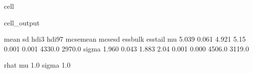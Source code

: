 \documentclass[letterpaper,10pt,english]{jupyterBook}
\begin{document}
\begin{sphinxuseclass}{cell}
\begin{sphinxVerbatimOutput}
\begin{sphinxuseclass}{cell_output}
\begin{sphinxVerbatim}[commandchars=\\\{\}]
        mean     sd  hdi\PYGZus{}3\PYGZpc{}  hdi\PYGZus{}97\PYGZpc{}  mcse\PYGZus{}mean  mcse\PYGZus{}sd  ess\PYGZus{}bulk  ess\PYGZus{}tail  \PYGZbs{}
mu     5.039  0.061   4.921     5.15      0.001    0.001    4330.0    2970.0   
sigma  1.960  0.043   1.883     2.04      0.001    0.000    4506.0    3119.0   

       r\PYGZus{}hat  
mu       1.0  
sigma    1.0  
\end{sphinxVerbatim}

\end{sphinxuseclass}\end{sphinxVerbatimOutput}

\end{sphinxuseclass}
\sphinxAtStartPar
{}
\end{document}

